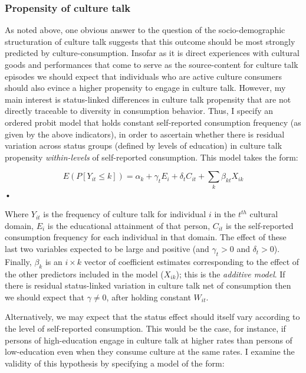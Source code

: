 \subsubsection{Propensity of culture talk}
As noted above, one obvious answer to the question of the socio-demographic structuration of culture talk suggests that this outcome should be most strongly predicted by culture-consumption. Insofar as it is direct experiences with cultural goods and performances that come to serve as the source-content for culture talk episodes we should expect that individuals who are active culture consumers should also evince a higher propensity to engage in culture talk. However, my main interest is status-linked differences in culture talk propensity that are not directly traceable to diversity in consumption behavior.  Thus, I specify an ordered probit model \citep{long_freese06} that holds constant self-reported consumption frequency (as given by the above indicators), in order to ascertain whether there is residual variation across status groups (defined by levels of education) in culture talk propensity \emph{within-levels} of self-reported consumption.  This model takes the form:

\begin{equation}
E(P[Y_{it} \leq k])= \alpha_k + \gamma_t E_i + \delta_t C_{it} + \sum_k\beta_{kt}X_{ik} 
\label{eq:eq1}
\end{equation}•

Where $Y_{it}$ is the frequency of culture talk for individual $i$  in the $t^{th}$ cultural domain, $E_{i}$ is the educational attainment of that person, $C_{it}$ is the self-reported consumption frequency for each individual in that domain.  The effect of these last two  variables expected to be large and positive (and $\gamma_t>0$ and $\delta_t>0$). Finally, $\beta_k$ is an $i \times k$ vector of coefficient estimates corresponding to the effect of the other predictors included in the model ($X_{ik}$); this is the \emph{additive model}.  If there is residual status-linked variation in culture talk net of consumption then we should expect that $\gamma \neq 0$, after holding constant $W_{it}$.  

Alternatively, we may expect that the status effect should itself vary according to the level of self-reported consumption.  This would be the case, for instance, if persons of high-education engage in culture talk at higher rates than persons of low-education even when they consume culture at the same rates. I examine the validity of this hypothesis by specifying a model of the form:

